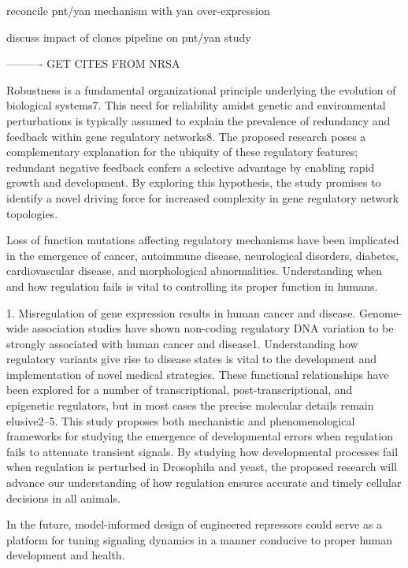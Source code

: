 reconcile pnt/yan mechanism with yan over-expression

discuss impact of clones pipeline on pnt/yan study





---------- GET CITES FROM NRSA

Robustness is a fundamental organizational principle underlying the evolution of biological systems7. This need for reliability amidst genetic and environmental perturbations is typically assumed to explain the prevalence of redundancy and feedback within gene regulatory networks8. The proposed research poses a complementary explanation for the ubiquity of these regulatory features; redundant negative feedback confers a selective advantage by enabling rapid growth and development. By exploring this hypothesis, the study promises to identify a novel driving force for increased complexity in gene regulatory network topologies. 



Loss of function mutations affecting regulatory mechanisms have been implicated in the emergence of cancer, autoimmune disease, neurological disorders, diabetes, cardiovascular disease, and morphological abnormalities. Understanding when and how regulation fails is vital to controlling its proper function in humans.

1.	Misregulation of gene expression results in human cancer and disease. Genome-wide association studies have shown non-coding regulatory DNA variation to be strongly associated with human cancer and disease1. Understanding how regulatory variants give rise to disease states is vital to the development and implementation of novel medical strategies. These functional relationships have been explored for a number of transcriptional, post-transcriptional, and epigenetic regulators, but in most cases the precise molecular details remain elusive2–5. This study proposes both mechanistic and phenomenological frameworks for studying the emergence of developmental errors when regulation fails to attenuate transient signals. By studying how developmental processes fail when regulation is perturbed in Drosophila and yeast, the proposed research will advance our understanding of how regulation ensures accurate and timely cellular decisions in all animals.  

In the future, model-informed design of engineered repressors could serve as a platform for tuning signaling dynamics in a manner conducive to proper human development and health.

